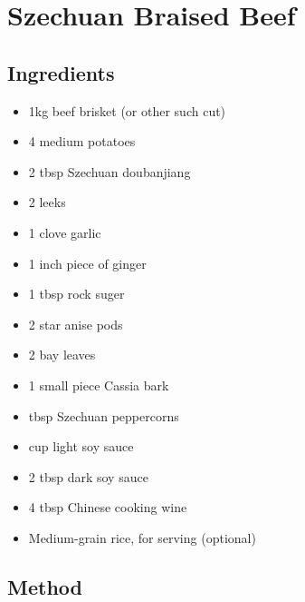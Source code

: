 \section{Szechuan Braised Beef}


\subsection{Ingredients}

\begin{itemize}
  \item 1kg beef brisket (or other such cut)
  \item 4 medium potatoes
  \item 2 tbsp Szechuan doubanjiang
  \item 2 leeks
  \item 1 clove garlic
  \item 1 inch piece of ginger
  \item 1 tbsp rock suger
  \item 2 star anise pods
  \item 2 bay leaves
  \item 1 small piece Cassia bark
  \item {} tbsp Szechuan peppercorns
  \item {} cup light soy sauce
  \item 2 tbsp dark soy sauce
  \item 4 tbsp Chinese cooking wine
  \item Medium-grain rice, for serving (optional)
\end{itemize}

\subsection{Method}

